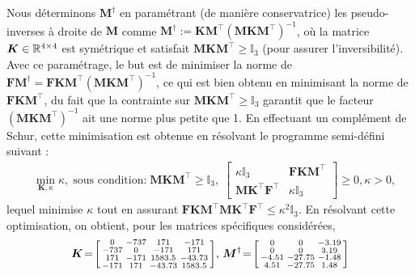 Nous déterminons $\boldsymbol{M}^{\dag}$ en paramétrant (de manière conservatrice) les  pseudo-inverses à droite de $\boldsymbol{M}$ comme $\boldsymbol{M}^{\dag} := \boldsymbol{K}\boldsymbol{M}^\top ( \boldsymbol{M}\boldsymbol{K}\boldsymbol{M}^\top)^{-1}$, où la matrice $\boldsymbol{K} \in {\mathbb R}^{4\times 4}$ est symétrique et satisfait $\boldsymbol{M}\boldsymbol{K}\boldsymbol{M}^\top \geq \mathbb{I}_3$ (pour assurer l'inversibilité). Avec ce paramétrage, le but est de minimiser la norme de $\boldsymbol{F}\boldsymbol{M}^{\dag} = \boldsymbol{F} \boldsymbol{K}\boldsymbol{M}^\top ( \boldsymbol{M}\boldsymbol{K}\boldsymbol{M}^\top)^{-1}$, ce qui est bien obtenu en minimisant la norme de $\boldsymbol{F} \boldsymbol{K}\boldsymbol{M}^\top$, du fait que la contrainte sur $\boldsymbol{M}\boldsymbol{K}\boldsymbol{M}^\top \geq \mathbb{I}_3$ garantit que le facteur $( \boldsymbol{M}\boldsymbol{K}\boldsymbol{M}^\top)^{-1}$ ait une norme plus petite que 1.
En effectuant un complément de Schur, cette minimisation est obtenue en résolvant le programme semi-défini suivant :
\begin{align*}
&  \min_{\boldsymbol{K}, \kappa} \kappa, \; \mbox{sous condition:}
\;  \boldsymbol{M} \boldsymbol{K} \boldsymbol{M}^\top\! \geq \!\mathbb{I}_3, \; 
  \begin{bmatrix}
  \kappa \mathbb{I}_3  &\! \boldsymbol{F} \boldsymbol{K} \boldsymbol{M}^\top \\ 
  \boldsymbol{M} \boldsymbol{K}^\top \boldsymbol{F}^\top &\! \kappa \mathbb{I}_3
  \end{bmatrix}\! \geq\! 0, \kappa > 0, 
\end{align*}
lequel minimise $\kappa$ tout en assurant $\boldsymbol{F} \boldsymbol{K} \boldsymbol{M}^\top \boldsymbol{M} \boldsymbol{K}^\top \boldsymbol{F}^\top \leq \kappa^2 \mathbb{I}_3$.  En résolvant cette optimisation, on obtient, pour les matrices spécifiques considérées,
\begin{align*}
    \boldsymbol{K} \!=\! \left[ \begin{smallmatrix}  0   &   -737   &    171   &   -171\\
      -737  &  0   &  -171  &     171\\
       171  &    -171    &   1583.5    &   -43.73\\
      -171  &     171    &   -43.73    &   1583.5 \end{smallmatrix} \right]\!, \,
      \boldsymbol{M}^{\dag} \!=\! \left[ \begin{smallmatrix}0     &          0   &   -3.19\\
                 0      &         0   &    3.19\\
               -4.51    &  -27.75    &   -1.48\\
                4.51    &  -27.75    &    1.48 \end{smallmatrix} \right]
\end{align*}
